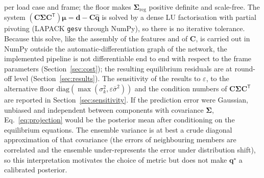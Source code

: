 per load case and frame; the floor makes $\boldsymbol{\Sigma}_\mathrm{reg}$ positive definite and scale-free. The system $(\mathbf{C}\boldsymbol{\Sigma}\mathbf{C}^{\mathsf T})\boldsymbol{\mu} = \mathbf{d}-\mathbf{C}\hat{\mathbf{q}}$ is solved by a dense LU factorisation with partial pivoting (LAPACK \texttt{gesv} through NumPy), so there is no iterative tolerance. Because this solve, like the assembly of the features and of $\mathbf{C}$, is carried out in NumPy outside the automatic-differentiation graph of the network, the implemented pipeline is not differentiable end to end with respect to the frame parameters (Section~\ref{sec:cost}); the resulting equilibrium residuals are at round-off level (Section~\ref{sec:results}). The sensitivity of the results to $\varepsilon$, to the alternative floor $\mathrm{diag}(\max(\sigma_k^2,\varepsilon\bar\sigma^2))$ and the condition numbers of $\mathbf{C}\boldsymbol{\Sigma}\mathbf{C}^{\mathsf T}$ are reported in Section~\ref{sec:sensitivity}. If the prediction error were Gaussian, unbiased and independent between components with covariance $\boldsymbol{\Sigma}$, Eq.~\eqref{eq:projection} would be the posterior mean after conditioning on the equilibrium equations. The ensemble variance is at best a crude diagonal approximation of that covariance (the errors of neighbouring members are correlated and the ensemble under-represents the error under distribution shift), so this interpretation motivates the choice of metric but does not make $\mathbf{q}^\star$ a calibrated posterior.

